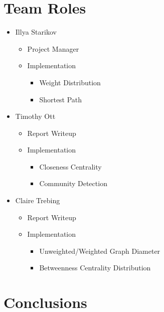 \documentclass{article}
\begin{document}
\section{Team Roles}
\begin{itemize}
    \item Illya Starikov
    \begin{itemize}
        \item Project Manager
        \item Implementation
        \begin{itemize}
            \item Weight Distribution
            \item Shortest Path
        \end{itemize}
    \end{itemize}

    \item Timothy Ott
    \begin{itemize}
        \item Report Writeup
        \item Implementation
        \begin{itemize}
            \item Closeness Centrality
            \item Community Detection
        \end{itemize}
    \end{itemize}

    \item Claire Trebing
    \begin{itemize}
        \item Report Writeup
        \item Implementation
        \begin{itemize}
            \item Unweighted/Weighted Graph Diameter
            \item Betweenness Centrality Distribution
        \end{itemize}
    \end{itemize}
\end{itemize}

\section{Conclusions}
\end{document}
